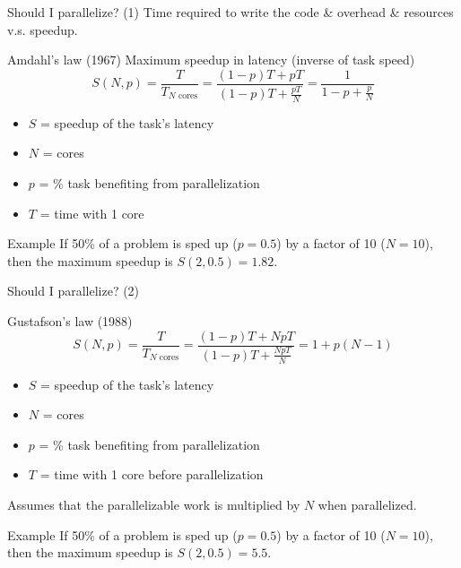 \documentclass[
  ignorenonframetext,
  usenames,
  dvipsnames]{beamer}
\begin{document}
\begin{frame}{Should I parallelize? (1)}
\protect\hypertarget{should-i-parallelize-1}{}
Time required to write the code \& overhead \& resources v.s. speedup.

\begin{block}{Amdahl's law (1967)}
Maximum speedup in latency (inverse of task speed)
\[
S(N, p) = \frac{T}{T_{N \text{ cores}}} = \frac{(1-p)T + pT}{(1-p)T + \frac{pT}{N}} = \frac{1}{1-p+\frac{p}{N}}
\]
\begin{itemize}
  \itemsep 0em
  \item \(S\) = speedup of the task's latency
  \item \(N\) = cores
  \item \(p\) = \% task benefiting from parallelization
  \item \(T\) = time with 1 core
\end{itemize}
\end{block}

\begin{block}{Example}
If 50\% of a problem is sped up (\(p = 0.5\)) by a factor of 10 (\(N = 10\)), then the maximum speedup is \(S(2, 0.5) = 1.82\).
\end{block}
\end{frame}

\begin{frame}{Should I parallelize? (2)}
\protect\hypertarget{should-i-parallelize-2}{}
\begin{block}{Gustafson's law (1988)}
\[
S(N, p) = \frac{T}{T_{N \text{ cores}}} = \frac{(1-p)T + NpT}{(1 - p) T + \frac{NpT}{N}} = 1 + p(N - 1)
\]
\begin{itemize}
  \itemsep 0em
  \item \(S\) = speedup of the task's latency
  \item \(N\) = cores
  \item \(p\) = \% task benefiting from parallelization
  \item \(T\) = time with 1 core before parallelization
\end{itemize}
\end{block}

Assumes that the parallelizable work is multiplied by \(N\) when
parallelized.

\begin{block}{Example}
If 50\% of a problem is sped up (\(p = 0.5\)) by a factor of 10 (\(N = 10\)), then the maximum speedup is \(S(2, 0.5) = 5.5\).
\end{block}
\end{frame}
\end{document}
